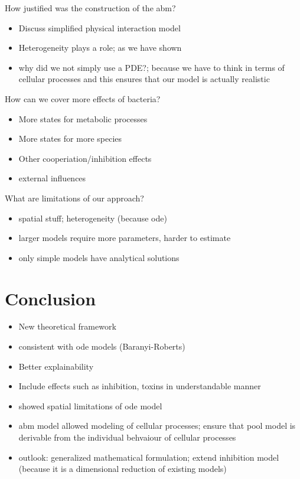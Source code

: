 \documentclass[10pt,A4paper]{article}
\numberwithin{equation}{section}
\begin{document}
\noindent
How justified was the construction of the \ac{abm}?
\begin{itemize}
    \item Discuss simplified physical interaction model
    \item Heterogeneity plays a role; as we have shown
    \item why did we not simply use a PDE?; because we have to think in terms of cellular processes
        and this ensures that our model is actually realistic
\end{itemize}

\noindent
How can we cover more effects of bacteria?
\begin{itemize}
    \item More states for metabolic processes
    \item More states for more species
    \item Other cooperiation/inhibition effects
    \item external influences
\end{itemize}

\noindent
What are limitations of our approach?
\begin{itemize}
    \item spatial stuff; heterogeneity (because \ac{ode})
    \item larger models require more parameters, harder to estimate
    \item only simple models have analytical solutions
\end{itemize}

\section{Conclusion}
\noindent
\begin{itemize}
    \item New theoretical framework
    \item consistent with \ac{ode} models (Baranyi-Roberts)
    \item Better explainability
    \item Include effects such as inhibition, toxins in understandable manner
    \item showed spatial limitations of \ac{ode} model
    \item \ac{abm} model allowed modeling of cellular processes; ensure that pool model is derivable
        from the individual behvaiour of cellular processes
    \item outlook: generalized mathematical formulation; extend inhibition model (because it is a
        dimensional reduction of existing models)
\end{itemize}
\end{document}
